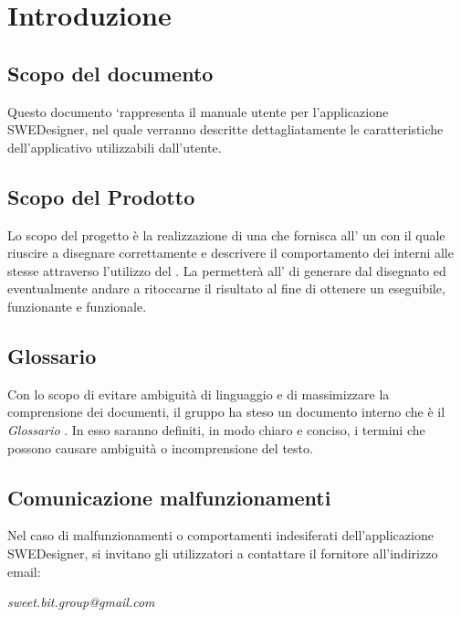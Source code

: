 \section{Introduzione}
  \subsection{Scopo del documento}
          Questo documento `rappresenta il manuale utente per l'applicazione SWEDesigner, nel quale verranno descritte dettagliatamente le caratteristiche dell'applicativo utilizzabili dall'utente.
  \subsection{Scopo del Prodotto}
          Lo scopo del progetto è la realizzazione di una  che fornisca all' un   con il quale riuscire a disegnare correttamente 
          e descrivere il comportamento dei  interni alle stesse attraverso l'utilizzo del .
          La  permetterà all' di generare   dal  disegnato ed eventualmente andare a ritoccarne il risultato al fine di ottenere un 
          eseguibile, funzionante e funzionale.
  \subsection{Glossario}
          Con lo scopo di evitare ambiguità di linguaggio e di massimizzare la comprensione dei documenti, il
          gruppo ha steso un documento interno che è il \emph{Glossario \VersioneG{}}. In esso saranno definiti, in modo
          chiaro e conciso, i termini che possono causare ambiguità o incomprensione del testo.
  \subsection{Comunicazione malfunzionamenti}
  Nel caso di malfunzionamenti o comportamenti indesiferati dell'applicazione SWEDesigner, si invitano gli utilizzatori a contattare il fornitore all'indirizzo email:\\
  \begin{center}
  \emph{sweet.bit.group@gmail.com}
  \end{center}
